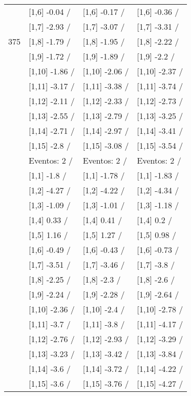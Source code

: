 \begin{table}
\begin{tabular}[t]{llll}
 & {}[1,6] -0.04  / & {}[1,6] -0.17  / & {}[1,6] -0.36  /\\
 & {}[1,7] -2.93  / & {}[1,7] -3.07  / & {}[1,7] -3.31  /\\
375 & {}[1,8] -1.79  / & {}[1,8] -1.95  / & {}[1,8] -2.22  /\\
\addlinespace
 & {}[1,9] -1.72  / & {}[1,9] -1.89  / & {}[1,9] -2.2  /\\
 & {}[1,10] -1.86  / & {}[1,10] -2.06  / & {}[1,10] -2.37  /\\
 & {}[1,11] -3.17  / & {}[1,11] -3.38  / & {}[1,11] -3.74  /\\
 & {}[1,12] -2.11  / & {}[1,12] -2.33  / & {}[1,12] -2.73  /\\
 & {}[1,13] -2.55  / & {}[1,13] -2.79  / & {}[1,13] -3.25  /\\
\addlinespace
 & {}[1,14] -2.71  / & {}[1,14] -2.97  / & {}[1,14] -3.41  /\\
 & {}[1,15] -2.8  / & {}[1,15] -3.08  / & {}[1,15] -3.54  /\\
 & Eventos:  2 / & Eventos:  2 / & Eventos:  2 /\\
 & {}[1,1] -1.8  / & {}[1,1] -1.78  / & {}[1,1] -1.83  /\\
 & {}[1,2] -4.27  / & {}[1,2] -4.22  / & {}[1,2] -4.34  /\\
\addlinespace
 & {}[1,3] -1.09  / & {}[1,3] -1.01  / & {}[1,3] -1.18  /\\
 & {}[1,4] 0.33  / & {}[1,4] 0.41  / & {}[1,4] 0.2  /\\
 & {}[1,5] 1.16  / & {}[1,5] 1.27  / & {}[1,5] 0.98  /\\
 & {}[1,6] -0.49  / & {}[1,6] -0.43  / & {}[1,6] -0.73  /\\
 & {}[1,7] -3.51  / & {}[1,7] -3.46  / & {}[1,7] -3.8  /\\
\addlinespace
500 & {}[1,8] -2.25  / & {}[1,8] -2.3  / & {}[1,8] -2.6  /\\
 & {}[1,9] -2.24  / & {}[1,9] -2.28  / & {}[1,9] -2.64  /\\
 & {}[1,10] -2.36  / & {}[1,10] -2.4  / & {}[1,10] -2.78  /\\
 & {}[1,11] -3.7  / & {}[1,11] -3.8  / & {}[1,11] -4.17  /\\
 & {}[1,12] -2.76  / & {}[1,12] -2.93  / & {}[1,12] -3.29  /\\
\addlinespace
 & {}[1,13] -3.23  / & {}[1,13] -3.42  / & {}[1,13] -3.84  /\\
 & {}[1,14] -3.6  / & {}[1,14] -3.72  / & {}[1,14] -4.22  /\\
 & {}[1,15] -3.6  / & {}[1,15] -3.76  / & {}[1,15] -4.27  /\\
\bottomrule
\end{tabular}
\end{table}
